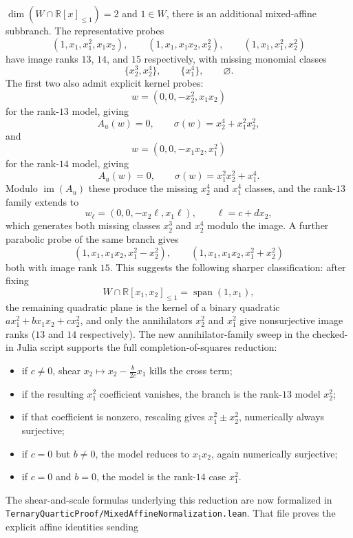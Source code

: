 \documentclass[11pt]{article}
\begin{document}
\begin{itemize}
  $\dim(W \cap \mathbb{R}[x]_{\le 1}) = 2$ and $1 \in W$, there is an
  additional mixed-affine subbranch. The representative probes
  \[
    (1,x_1,x_1^2,x_1x_2),\qquad
    (1,x_1,x_1x_2,x_2^2),\qquad
    (1,x_1,x_1^2,x_2^2)
  \]
  have image ranks $13$, $14$, and $15$ respectively, with missing monomial
  classes
  \[
    \{x_2^3,x_2^4\},\qquad \{x_1^4\},\qquad \varnothing.
  \]
  The first two also admit explicit kernel probes:
  \[
    w = (0,0,-x_2^2,x_1x_2)
  \]
  for the rank-$13$ model, giving
  \[
    A_u(w)=0,\qquad \sigma(w)=x_2^4+x_1^2x_2^2,
  \]
  and
  \[
    w = (0,0,-x_1x_2,x_1^2)
  \]
  for the rank-$14$ model, giving
  \[
    A_u(w)=0,\qquad \sigma(w)=x_1^2x_2^2+x_1^4.
  \]
  Modulo $\operatorname{im}(A_u)$ these produce the missing $x_2^4$ and $x_1^4$
  classes, and the rank-$13$ family extends to
  \[
    w_\ell=(0,0,-x_2\ell,x_1\ell),\qquad \ell=c+d x_2,
  \]
  which generates both missing classes $x_2^3$ and $x_2^4$ modulo the image.
  A further parabolic probe of the same branch gives
  \[
    (1,x_1,x_1x_2,x_1^2-x_2^2),\qquad
    (1,x_1,x_1x_2,x_1^2+x_2^2)
  \]
  both with image rank $15$. This suggests the following sharper
  classification: after fixing
  \[
    W \cap \mathbb{R}[x_1,x_2]_{\le 1} = \operatorname{span}(1,x_1),
  \]
  the remaining quadratic plane is the kernel of a binary quadratic
  $a x_1^2 + b x_1x_2 + c x_2^2$, and only the annihilators $x_2^2$ and
  $x_1^2$ give nonsurjective image ranks ($13$ and $14$ respectively). The
  new annihilator-family sweep in the checked-in Julia script supports the full
  completion-of-squares reduction:
  \begin{itemize}
  \item if $c \neq 0$, shear $x_2 \mapsto x_2 - \frac{b}{2c}x_1$ kills the
    cross term;
  \item if the resulting $x_1^2$ coefficient vanishes, the branch is the
    rank-$13$ model $x_2^2$;
  \item if that coefficient is nonzero, rescaling gives $x_1^2 \pm x_2^2$,
    numerically always surjective;
  \item if $c = 0$ but $b \neq 0$, the model reduces to $x_1x_2$, again
    numerically surjective;
  \item if $c = 0$ and $b = 0$, the model is the rank-$14$ case $x_1^2$.
  \end{itemize}
  The shear-and-scale formulas underlying this reduction are now formalized in
  \texttt{TernaryQuarticProof/MixedAffineNormalization.lean}. That file proves
  the explicit affine identities sending
  \[
\]
\end{itemize}
\end{document}
